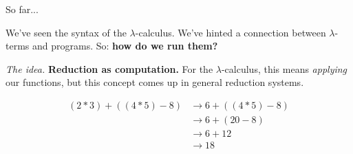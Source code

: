 \documentclass[10pt]{beamer}
\begin{document}
\begin{frame}{So far...}

We've seen the syntax of the $\lambda$-calculus. We've hinted a connection between $\lambda$-terms and programs. So: \textbf{how do we run them?}
\nxt

\textit{The idea.}
\textbf{Reduction as computation.} For the $\lambda$-calculus, this means \textit{applying} our functions, but this concept comes up in general reduction systems.
\nxt

\begin{example}
\vspace{-.5cm}
\begin{align*}
(2 * 3) + ((4 * 5) - 8) &\longrightarrow
6 + ((4 * 5) - 8) \\ &\longrightarrow
6 + (20 - 8) \\ &\longrightarrow
6 + 12 \\ &\longrightarrow
18
\end{align*}
\end{example}

\end{frame}


%
%
%
%
%
%
%
\end{document}
